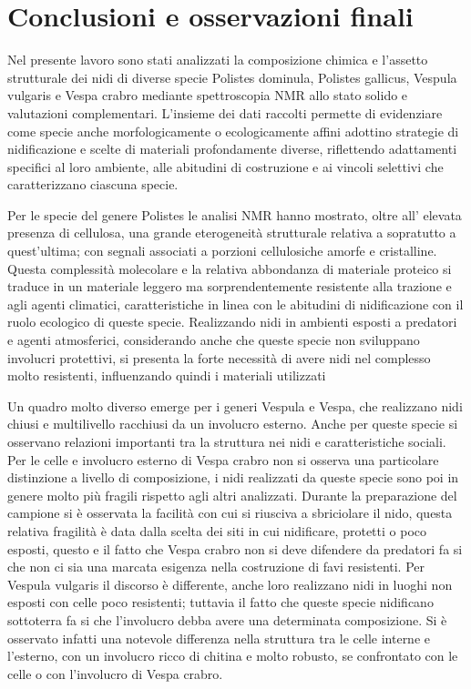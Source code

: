 
\chapter{Conclusioni e osservazioni finali}

Nel presente lavoro sono stati analizzati la composizione chimica e l’assetto strutturale dei nidi di diverse specie Polistes dominula, Polistes gallicus, Vespula vulgaris e Vespa crabro mediante spettroscopia NMR allo stato solido e valutazioni complementari.
L’insieme dei dati raccolti permette di evidenziare come specie anche morfologicamente o ecologicamente affini adottino strategie di nidificazione e scelte di materiali profondamente diverse, riflettendo adattamenti specifici al loro ambiente, alle abitudini di costruzione e ai vincoli selettivi che caratterizzano ciascuna specie.

Per le specie del genere Polistes le analisi NMR hanno mostrato, oltre all' elevata presenza di cellulosa, una grande eterogeneità strutturale relativa a sopratutto a quest'ultima; con segnali associati a porzioni cellulosiche amorfe e cristalline. 
Questa complessità molecolare e la relativa abbondanza di materiale proteico si traduce in un materiale leggero ma sorprendentemente resistente alla trazione e agli agenti climatici, caratteristiche in linea con le abitudini di nidificazione con il ruolo ecologico di queste specie.
Realizzando nidi in ambienti esposti a predatori e agenti atmosferici, considerando anche che queste specie non sviluppano involucri protettivi, si presenta la forte necessità di avere nidi nel complesso molto resistenti, influenzando quindi i materiali utilizzati

Un quadro molto diverso emerge per i generi Vespula e Vespa, che realizzano nidi chiusi e multilivello racchiusi da un involucro esterno. 
Anche per queste specie si osservano relazioni importanti tra la struttura nei nidi e caratteristiche sociali.
Per le celle e involucro esterno di Vespa crabro non si osserva una particolare distinzione a livello di composizione, i nidi realizzati da queste specie sono poi in genere molto più fragili rispetto agli altri analizzati.
Durante la preparazione del campione si è osservata la facilità con cui si riusciva a sbriciolare il nido, questa relativa fragilità è data dalla scelta dei siti in cui nidificare, protetti o poco esposti, questo e il fatto che Vespa crabro non si deve difendere da predatori fa si che non ci sia una marcata esigenza nella costruzione di favi resistenti.
Per Vespula vulgaris il discorso è differente, anche loro realizzano nidi in luoghi non esposti con celle poco resistenti; tuttavia il fatto che queste specie nidificano sottoterra fa si che l'involucro debba avere una determinata composizione.
Si è osservato infatti una notevole differenza nella struttura tra le celle interne e l'esterno, con un involucro ricco di chitina e molto robusto, se confrontato con le celle o con l'involucro di Vespa crabro.

